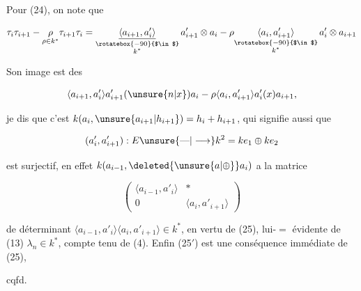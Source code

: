 
Pour (24), on note que

\[\tau_i\tau_{i+1}-\underset{\rho\in k^*}{\rho}\tau_{i+1}\tau_i=\underset{\substack{\rotatebox{-90}{$\in$}\\ k^*}}{\underline{\langle a_{i+1},a'_i\rangle}}\,a'_{i+1}\otimes a_i-\rho\underset{\substack{\rotatebox{-90}{$\in$}\\ k^*}}{\langle a_i,a'_{i+1}\rangle}\,a'_i\otimes a_{i+1}\]


Son image est  des

\[\langle a_{i+1},a'_i\rangle a'_{i+1}(\unsure{n|x})a_i-\rho\langle a_i,a'_{i+1}\rangle a'_i(x)a_{i+1},\]

je dis que c'est $k(a_i,\unsure{a_{i+1}|h_{i+1}})=h_i+h_{i+1}$,  qui  signifie aussi que

\[(a'_i,a'_{i+1}):E\unsure{\text{---}|\longrightarrow} k^2=ke_1\oplus ke_2\]

est surjectif, en effet   $k(a_{i-1},\deleted{\unsure{a|\oplus}}a_i)$ a la matrice 

\[\begin{pmatrix}\langle a_{i-1},a'_i\rangle&*\\0&\langle a_i,a'_{i+1}\rangle\end{pmatrix}\]

de déterminant $\langle a_{i-1},a'_i\rangle\langle a_i,a'_{i+1}\rangle\in k^*$, en vertu de (25), lui-$=$  évidente de (13) $\lambda_n\in k^*$, compte tenu de (4). Enfin (25$'$) est une conséquence immédiate de (25),

cqfd.


